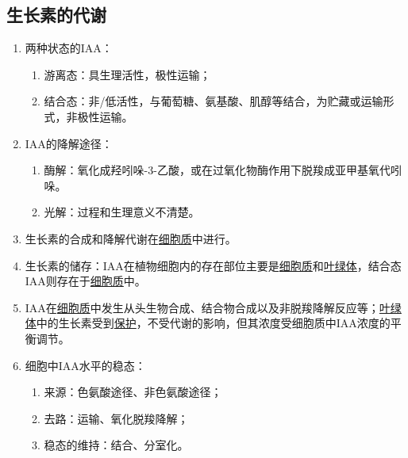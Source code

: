 \subsection{生长素的代谢}
\begin{enumerate}
    \item 两种状态的IAA：
    \begin{enumerate}
        \item 游离态：具生理活性，极性运输；
        \item 结合态：非/低活性，与葡萄糖、氨基酸、肌醇等结合，为贮藏或运输形式，非极性运输。
    \end{enumerate}
    \item IAA的降解途径：
    \begin{enumerate}
        \item 酶解：氧化成羟吲哚-3-乙酸，或在过氧化物酶作用下脱羧成亚甲基氧代吲哚。
        \item 光解：过程和生理意义不清楚。
    \end{enumerate}
    \item 生长素的合成和降解代谢在\uline{细胞质}中进行。
    \item 生长素的储存：IAA在植物细胞内的存在部位主要是\uline{细胞质}和\uline{叶绿体}，结合态IAA则存在于\uline{细胞质}中。
    \item IAA在\uline{细胞质}中发生从头生物合成、结合物合成以及非脱羧降解反应等；\uline{叶绿体}中的生长素受到\uline{保护}，不受代谢的影响，但其浓度受细胞质中IAA浓度的平衡调节。
    \item 细胞中IAA水平的稳态：
    \begin{enumerate}
        \item 来源：色氨酸途径、非色氨酸途径；
        \item 去路：运输、氧化脱羧降解；
        \item 稳态的维持：结合、分室化。
    \end{enumerate}
\end{enumerate}
